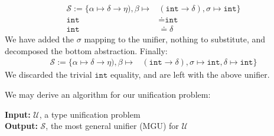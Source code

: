 \begin{Example}
    \begin{align*}
        \mathcal{S} := \{\alpha \mapsto \delta \to \eta), \beta \mapsto &(\texttt{int} \to \delta), \sigma \mapsto \texttt{int}\}\\
        \texttt{int} &\doteq \texttt{int}\\
        \texttt{int} &\doteq \delta
    \end{align*}
    \noindent
    We have added the $\sigma$ mapping to the unifier, nothing to substitute, and decomposed the bottom abstraction. Finally:
    \begin{align*}
        \mathcal{S} := \{\alpha \mapsto \delta \to \eta), \beta \mapsto &(\texttt{int} \to \delta), \sigma \mapsto \texttt{int},\delta \mapsto \texttt{int}\}
    \end{align*}
    \noindent
    We discarded the trivial $\texttt{int}$ equality, and are left with the above unifier.
\end{Example}

\newpage 

\noindent
We may derive an algorithm for our unification problem:
\begin{Func}
    \noindent
    \textbf{Input:} $\mathcal{U}$, a type unification problem \\
    \textbf{Output:} $\mathcal{S}$, the most general unifier (MGU) for $\mathcal{U}$ \\

    \vspace{-.5em}
    \begin{algorithm}[H]
        \SetAlgoLined
    \end{algorithm}
\end{Func}

